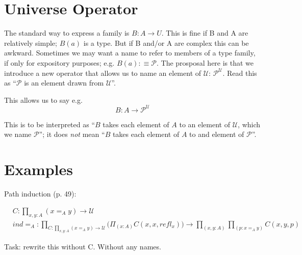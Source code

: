 \documentclass{article}
\begin{document}
\section{Universe Operator}

The standard way to express a family is \(B:A\to U\).  This is fine if
B and A are relatively simple; \(B(a)\) is a type.  But if B and/or A
are complex this can be awkward.  Sometimes we may want a name to
refer to members of a type family, if only for expository purposes;
e.g. \(B(a) :\equiv \mathcal{P}\).  The prosposal here is that we
introduce a new operator that allows us to name an element of
\(\mathcal{U}\): \(\mathcal{P}^{\mathcal{U}}\).  Read this as
``\(\mathcal{P}\) is an element drawn from \(\mathcal{U}\)''.

This allows us to say e.g. \[B:A\to \mathcal{P}^{\mathcal{U}}\]

This is to be interpreted as ``\(B\) takes each element of \(A\) to an
element of \(\mathcal{U}\), which we name \(\mathcal{P}\)''; it does
\emph{not} mean ``\(B\) takes each element of \(A\) to and element of
\(\mathcal{P}\)''.

\section{Examples}

Path induction (p. 49):

\begin{align}
  &C:\prod\limits_{x,y:A} (x =_A y) \to \mathcal{U} &\\
  &ind=_A: \prod_{C:\prod_{x,y:A}(x=_Ay)\to\mathcal{U}}\Big(\Pi_{(x:A)}C(x,x,refl_x)\Big)\to \prod_{(x,y:A)}\prod_{(p:x=_Ay)} C(x,y,p)
\end{align}

Task: rewrite this without C.  Without any names.
\end{document}
